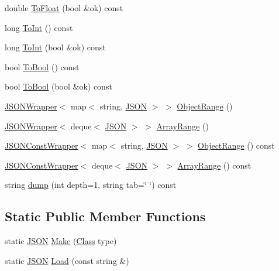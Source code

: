 \begin{DoxyCompactItemize}
\item 
double \mbox{\hyperlink{classjson_1_1_j_s_o_n_ae913234cd95a1338faf8e198b5a0eb38}{To\+Float}} (bool \&ok) const
\item 
long \mbox{\hyperlink{classjson_1_1_j_s_o_n_a867eb9869140b69428287c98d4f56388}{To\+Int}} () const
\item 
long \mbox{\hyperlink{classjson_1_1_j_s_o_n_a12e5b118ced359fd4a315c95a7486007}{To\+Int}} (bool \&ok) const
\item 
bool \mbox{\hyperlink{classjson_1_1_j_s_o_n_adb9ab4683ee30055912b47220780de16}{To\+Bool}} () const
\item 
bool \mbox{\hyperlink{classjson_1_1_j_s_o_n_aa86f03b8572b13dd768c902da2d83efa}{To\+Bool}} (bool \&ok) const
\item 
\mbox{\hyperlink{classjson_1_1_j_s_o_n_1_1_j_s_o_n_wrapper}{J\+S\+O\+N\+Wrapper}}$<$ map$<$ string, \mbox{\hyperlink{classjson_1_1_j_s_o_n}{J\+S\+ON}} $>$ $>$ \mbox{\hyperlink{classjson_1_1_j_s_o_n_a5e2527751cd1ae28b29e82fd1de15555}{Object\+Range}} ()
\item 
\mbox{\hyperlink{classjson_1_1_j_s_o_n_1_1_j_s_o_n_wrapper}{J\+S\+O\+N\+Wrapper}}$<$ deque$<$ \mbox{\hyperlink{classjson_1_1_j_s_o_n}{J\+S\+ON}} $>$ $>$ \mbox{\hyperlink{classjson_1_1_j_s_o_n_ab26986d77f63734f154da3606423c098}{Array\+Range}} ()
\item 
\mbox{\hyperlink{classjson_1_1_j_s_o_n_1_1_j_s_o_n_const_wrapper}{J\+S\+O\+N\+Const\+Wrapper}}$<$ map$<$ string, \mbox{\hyperlink{classjson_1_1_j_s_o_n}{J\+S\+ON}} $>$ $>$ \mbox{\hyperlink{classjson_1_1_j_s_o_n_a23a72db5a52bca8b080334198bb25041}{Object\+Range}} () const
\item 
\mbox{\hyperlink{classjson_1_1_j_s_o_n_1_1_j_s_o_n_const_wrapper}{J\+S\+O\+N\+Const\+Wrapper}}$<$ deque$<$ \mbox{\hyperlink{classjson_1_1_j_s_o_n}{J\+S\+ON}} $>$ $>$ \mbox{\hyperlink{classjson_1_1_j_s_o_n_a7e57080ed10b2903c792146f81bf90eb}{Array\+Range}} () const
\item 
string \mbox{\hyperlink{classjson_1_1_j_s_o_n_acb99af0df2045a504f6bbc08bf5c4990}{dump}} (int depth=1, string tab=\char`\"{}  \char`\"{}) const
\end{DoxyCompactItemize}
\subsection*{Static Public Member Functions}
\begin{DoxyCompactItemize}
\item 
static \mbox{\hyperlink{classjson_1_1_j_s_o_n}{J\+S\+ON}} \mbox{\hyperlink{classjson_1_1_j_s_o_n_aa679dc348ed9711357c315a461b65957}{Make}} (\mbox{\hyperlink{classjson_1_1_j_s_o_n_a762f55df6d407c1af61607ed516ffe07}{Class}} type)
\item 
static \mbox{\hyperlink{classjson_1_1_j_s_o_n}{J\+S\+ON}} \mbox{\hyperlink{classjson_1_1_j_s_o_n_a799ab1cc68cb6e2a41ec948a9a2ecc37}{Load}} (const string \&)
\end{DoxyCompactItemize}
